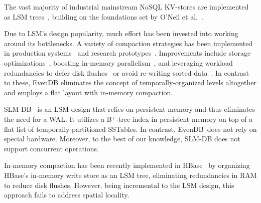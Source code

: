 \documentclass[sigplan,10pt]{acmart}
\newcommand{\remove}[1]{}
\newcommand{\sys}{EvenDB}
\begin{document}
The vast majority of industrial mainstream NoSQL KV-stores are  implemented as LSM trees~\cite{hbase, 
RocksDB, scylladb, Bigtable2008, cassandra2010}, building on the foundations set by O'Neil 
et al.~\cite{DBLP:journals/acta/ONeilCGO96, Muth1998}. 

Due to LSM's design popularity, much effort has been invested into working around its bottlenecks.
A variety of compaction strategies has been implemented in production systems~\cite{CallaghanCompaction, 
ScyllaCompaction} and research prototypes~\cite{triad, PebblesDB, vttrees, slmdb}.  Improvements
 include storage
optimizations~\cite{WiscKey, PebblesDB, vttrees, slmdb,Papagiannis:2018:EMK:3267809.3267824}, 
boosting  in-memory parallelism~\cite{scylladb, clsm2015}, and leveraging 
 workload redundancies to defer disk flushes~\cite{triad, accordion} or avoid re-writing sorted data~\cite{vttrees}. 
In contrast to these, \sys\/ eliminates the concept of temporally-organized levels altogether
and employs a flat  layout with in-memory compaction.

\remove{
A number of systems focus on reducing write amplification.
PebblesDB~\cite{PebblesDB} introduces fragmented LSM trees in which level files are 
sliced into {\em guards\/} of increasing granularity and organized in a skiplist-like layout. 
In contrast, \sys\/ eliminates the concept of levels altogether, 
and employs a flat  layout. WiscKey~\cite{WiscKey} separates key and value storage 
in SSTables, also in order to reduce amplification. This optimization is orthogonal to \sys's concepts,
and could benefit our work as well. 
%
VT-Trees~\cite{vttrees} apply stitching to avoid rewriting already sorted data. This improves performance and significantly reduces write amplification in some scenarios (e.g., time-series ingestion).
}

SLM-DB~\cite{slmdb} is an LSM design that relies on persistent memory and thus eliminates the need for a WAL. It  
utilizes a B$^+$-tree index in persistent memory on top of a flat list of temporally-partitioned SSTables. 
In contrast, \sys\ does not rely on special hardware. 
Moreover, to the best of our knowledge, SLM-DB does not support concurrent operations.

In-memory compaction has been recently implemented in HBase~\cite{accordion} by organizing
HBase's in-memory write store  as an LSM tree, eliminating redundancies 
in RAM to reduce disk flushes. However, being incremental to the LSM design, 
this approach fails to address spatial locality. 
\end{document}
